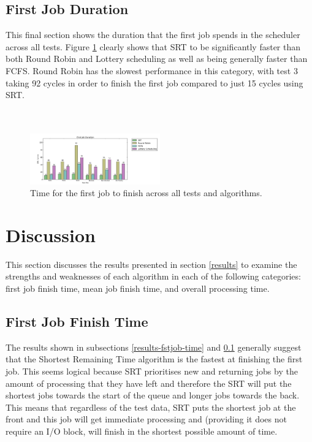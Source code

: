 \documentclass{acm_proc_article-sp}
\begin{document}
\subsection{First Job Duration}
\label{results-fstjob-duration}
This final section shows the duration that the first job spends in the scheduler across all tests. Figure \ref{fig:fstjob-duration} clearly shows that SRT to be significantly faster than both Round Robin and Lottery scheduling as well as being generally faster than FCFS. Round Robin has the slowest performance in this category, with test 3 taking 92 cycles in order to finish the first job compared to just 15 cycles using SRT.
\\\\\\
\begin{figure}[H]
\centering
\includegraphics[width=0.5\textwidth]{fstjob_duration.png}
\caption{Time for the first job to finish across all tests and algorithms.}
\label{fig:fstjob-duration}
\end{figure}

\section{Discussion}
This section discusses the results presented in section \ref{results} to examine the strengths and weaknesses of each algorithm in each of the following categories: first job finish time, mean job finish time, and overall processing time.

\subsection{First Job Finish Time}
The results shown in subsections \ref{results-fstjob-time} and \ref{results-fstjob-duration} generally suggest that the Shortest Remaining Time algorithm is the fastest at finishing the first job. This seems logical because SRT prioritises new and returning jobs by the amount of processing that they have left and therefore the SRT will put the shortest jobs towards the start of the queue and longer jobs towards the back. This means that regardless of the test data, SRT puts the shortest job at the front and this job will get immediate processing and (providing it does not require an I/O block, will finish in the shortest possible amount of time.
\end{document}
